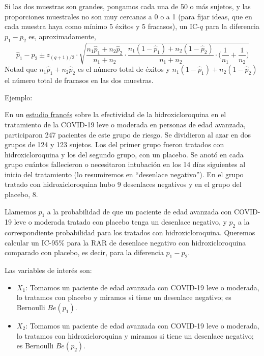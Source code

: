 \documentclass[
  spanish,
  letterpaper,
  DIV=11,
  numbers=noendperiod]{scrreprt}
\begin{document}
Si las dos muestras son grandes, pongamos cada una de 50 o más sujetos,
y las proporciones muestrales no son muy cercanas a 0 o a 1 (para fijar
ideas, que en cada muestra haya como mínimo 5 éxitos y 5 fracasos), un
IC-\(q\) para la diferencia \(p_1-p_2\) es, aproximadamente, \[
\widehat{p}_1-\widehat{p}_2 \pm z_{(q+1)/2}\cdot
\sqrt{\frac{n_1 \widehat{p}_1 +n_2 \widehat{p}_2}{n_1
+n_2}\cdot \frac{n_1 (1-\widehat{p}_1) +n_2( 1-\widehat{p}_2)}{n_1
+n_2}\cdot \Big(\frac{1}{n_1}+\frac{1}{n_2}
\Big)}
\] Notad que \(n_1 \widehat{p}_1 +n_2 \widehat{p}_2\) es el número total
de éxitos y \(n_1 (1-\widehat{p}_1) +n_2( 1-\widehat{p}_2)\) el número
total de fracasos en las dos muestras.

Ejemplo:

En un
\href{https://www.medrxiv.org/content/10.1101/2020.10.19.20214940v1}{estudio
francés} sobre la efectividad de la hidroxicloroquina en el tratamiento
de la COVID-19 leve o moderada en personas de edad avanzada,
participaron 247 pacientes de este grupo de riesgo. Se dividieron al
azar en dos grupos de 124 y 123 sujetos. Los del primer grupo fueron
tratados con hidroxicloroquina y los del segundo grupo, con un placebo.
Se anotó en cada grupo cuántos fallecieron o necesitaron intubación en
los 14 días siguientes al inicio del tratamiento (lo resumiremos en
``desenlace negativo''). En el grupo tratado con hidroxicloroquina hubo
9 desenlaces negativos y en el grupo del placebo, 8.

Llamemos \(p_1\) a la probabilidad de que un paciente de edad avanzada
con COVID-19 leve o moderada tratado con placebo tenga un desenlace
negativo, y \(p_2\) a la correspondiente probabilidad para los tratados
con hidroxicloroquina. Queremos calcular un IC-95\% para la RAR de
desenlace negativo con hidroxicloroquina comparado con placebo, es
decir, para la diferencia \(p_1-p_2\).

Las variables de interés son:

\begin{itemize}
\item
  \(X_1\): Tomamos un paciente de edad avanzada con COVID-19 leve o
  moderada, lo tratamos con placebo y miramos si tiene un desenlace
  negativo; es Bernoulli \(Be(p_1)\).
\item
  \(X_2\): Tomamos un paciente de edad avanzada con COVID-19 leve o
  moderada, lo tratamos con hidroxicloroquina y miramos si tiene un
  desenlace negativo; es Bernoulli \(Be(p_2)\).
\end{itemize}
\end{document}
